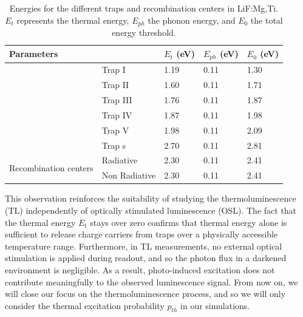 \renewcommand{\arraystretch}{1.5}
\begin{longtable}[c]{lllll}
\caption{Energies for the different traps and recombination centers in LiF:Mg,Ti. $E_t$ represents the thermal energy, $E_{ph}$ the phonon energy, and $E_0$ the total energy threshold.}
\label{tab:energythresholds}\\
\hline
\multicolumn{2}{l}{Parameters}                            & $E_t$ (eV) & $E_{ph}$ (eV) & $E_0$ (eV) \\ \hline
\endhead
\hline
\endfoot
\endlastfoot
\multirow{6}{*}{Trapping Centers}      & Trap I        & 1.19       & 0.11         & 1.30       \\
                                       & Trap II       & 1.60       & 0.11         & 1.71       \\
                                       & Trap III      & 1.76       & 0.11         & 1.87       \\
                                       & Trap IV       & 1.87       & 0.11         & 1.98       \\
                                       & Trap V        & 1.98       & 0.11         & 2.09       \\
                                       & Trap s        & 2.70       & 0.11         & 2.81       \\ \hline
\multirow{2}{*}{Recombination centers} & Radiative     & 2.30       & 0.11         & 2.41       \\
                                       & Non Radiative & 2.30       & 0.11         & 2.41       \\ \hline
\end{longtable}

\vspace{10pt}

This observation reinforces the suitability of studying the thermoluminescence (TL) independently of optically stimulated luminescence (OSL). The fact that the thermal energy $E_t$ stays over zero confirms that thermal energy alone is sufficient to release charge carriers from traps over a physically accessible temperature range. Furthermore, in TL measurements, no external optical stimulation is applied during readout, and so the photon flux in a darkened environment is negligible. As a result, photo-induced excitation does not contribute meaningfully to the observed luminescence signal. From now on, we will close our focus on the thermoluminescence process, and so we will only consider the thermal excitation probability $p_{th}$ in our simulations.


